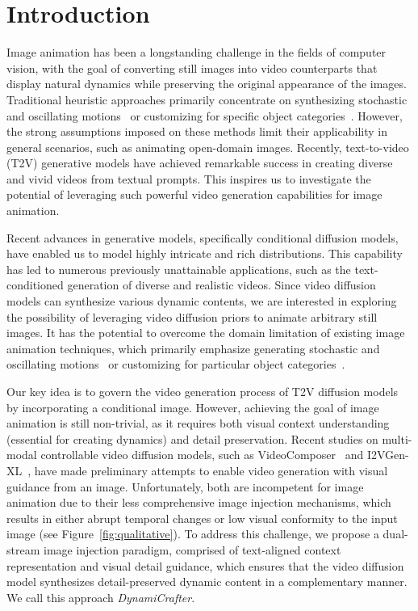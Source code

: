 \section{Introduction}
\label{sec:introduction}

Image animation has been a longstanding challenge in the fields of computer vision, with the goal of converting still images into video counterparts that display natural dynamics while preserving the original appearance of the images. Traditional heuristic approaches primarily concentrate on synthesizing stochastic and oscillating motions~\cite{lee2018stochastic,li2023generative} or customizing for specific object categories~\cite{holynski2021animating,karras2023dreampose}. However, the strong assumptions imposed on these methods limit their applicability in general scenarios, such as animating open-domain images.
Recently, text-to-video (T2V) generative models have achieved remarkable success in creating diverse and vivid videos from textual prompts. This inspires us to investigate the potential of leveraging such powerful video generation capabilities for image animation.

Recent advances in generative models, specifically conditional diffusion models, have enabled us to model highly intricate and rich distributions. This capability has led to numerous previously unattainable applications, such as the text-conditioned generation of diverse and realistic videos. Since video diffusion models can synthesize various dynamic contents, we are interested in exploring the possibility of leveraging video diffusion priors to animate arbitrary still images.
It has the potential to overcome the domain limitation of existing image animation techniques, which primarily emphasize generating stochastic and oscillating motions~\cite{lee2018stochastic,li2023generative} or customizing for particular object categories~\cite{holynski2021animating,karras2023dreampose}.
\fi

Our key idea is to govern the video generation process of T2V diffusion models by incorporating a conditional image. However, achieving the goal of image animation is still non-trivial, as it requires both visual context understanding (essential for creating dynamics) and detail preservation.
Recent studies on multi-modal controllable video diffusion models, such as VideoComposer~\cite{wang2023videocomposer} and I2VGen-XL~\cite{I2VGen-XL}, have made preliminary attempts to enable video generation with visual guidance from an image. Unfortunately, both are incompetent for image animation due to their less comprehensive image injection mechanisms, which results in either abrupt temporal changes or low visual conformity to the input image (see Figure~\ref{fig:qualitative}).
To address this challenge, we propose a dual-stream image injection paradigm, comprised of text-aligned context representation and visual detail guidance, which ensures that the video diffusion model synthesizes detail-preserved dynamic content in a complementary manner. We call this approach \textit{DynamiCrafter}.

